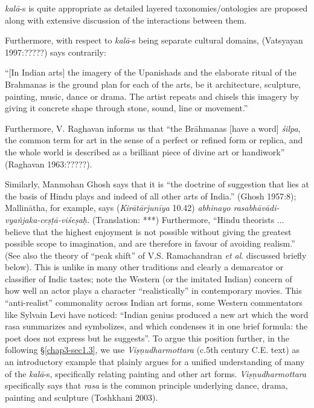 \textsl{kalā}-s is quite appropriate as detailed layered taxonomies/ontologies are proposed along with extensive discussion of the interactions between them.

Furthermore, with respect to \textsl{kalā}-s being separate cultural domains, (Vatsyayan 1997:?????) says contrarily:

\begin{myquote}
“[In Indian arts] the imagery of the Upanishads and the elaborate ritual of the Brahmanas is the ground plan for each of the arts, be it architecture, sculpture, painting, music, dance or drama. The artist repeats and chisels this imagery by giving it concrete shape through stone, sound, line or movement.”
\end{myquote}

Furthermore, V. Raghavan informs us that “the Brāhmanas [have a word] \textsl{śilpa}, the common term for art in the sense of a perfect or refined form or replica, and the whole world is described as a brilliant piece of divine art or handiwork” (Raghavan 1963:?????).

Similarly, Manmohan Ghosh says that it is “the doctrine of suggestion that lies at the basis of Hindu plays and indeed of all other arts of India.” (Ghosh 1957:8); Mallinātha, for example, says (\textsl{Kirātārjunīya} 10.42) \textsl{abhinayo rasabhāvādi-vyañjaka-ceṣṭā-viśeṣaḥ.} (Translation: ***) Furthermore, “Hindu theorists ... believe that the highest enjoyment is not possible without giving the greatest possible scope to imagination, and are therefore in favour of avoiding realism.” (See also the theory of “peak shift” of V.S. Ramachandran \textsl{et al}. discussed briefly below). This is unlike in many other traditions and clearly a demarcator or classifier of Indic tastes; note the Western (or the imitated Indian) concern of how well an actor plays a character “realistically” in contemporary movies. This “anti-realist” commonality across Indian art forms, some Western commentators like Sylvain Levi have noticed: “Indian genius produced a new art which the word rasa summarizes and symbolizes, and which condenses it in one brief formula: the poet does not express but he suggests”. To argue this position further, in the following \S\ref{chap3-sec1.3}, we use \textsl{Viṣṇudharmottara} (c.5th century C.E. text) as an introductory example that plainly argues for a unified understanding of many of the \textsl{kalā}-s, specifically relating painting and other art forms. \textsl{Viṣṇudharmottara} specifically says that \textsl{rasa} is the common principle underlying dance, drama, painting and sculpture (Toshkhani 2003).


